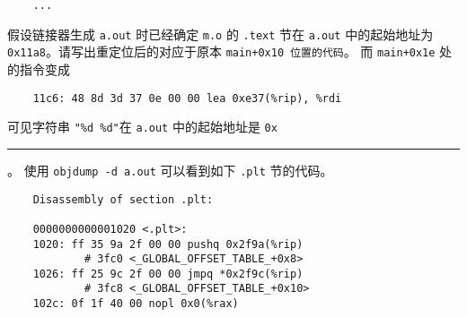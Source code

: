 \begin{problems}
\begin{verbatim}
    ...
        \end{verbatim}
            \subqn 假设链接器生成 \verb|a.out| 时已经确定 \verb|m.o| 的 \verb|.text| 节在 \verb|a.out| 中的起始地址为 \verb|0x11a8|。请写出重定位后的对应于原本 \verb|main+0x10 位置的代码|。
            \subqn 而 \verb|main+0x1e| 处的指令变成
            \begin{verbatim}
    11c6: 48 8d 3d 37 0e 00 00 lea 0xe37(%rip), %rdi
            \end{verbatim}
            可见字符串 \verb|"%d %d"|在 \verb|a.out| 中的起始地址是 \verb|0x|\rule{2.5cm}{0.25mm}。
        \qn 使用 \verb|objdump -d a.out| 可以看到如下 \verb|.plt| 节的代码。
        \begin{verbatim}
    Disassembly of section .plt:
    
    0000000000001020 <.plt>:
    1020: ff 35 9a 2f 00 00 pushq 0x2f9a(%rip)
            # 3fc0 <_GLOBAL_OFFSET_TABLE_+0x8>
    1026: ff 25 9c 2f 00 00 jmpq *0x2f9c(%rip)
            # 3fc8 <_GLOBAL_OFFSET_TABLE_+0x10>
    102c: 0f 1f 40 00 nopl 0x0(%rax)


\end{verbatim}
\end{problems}
